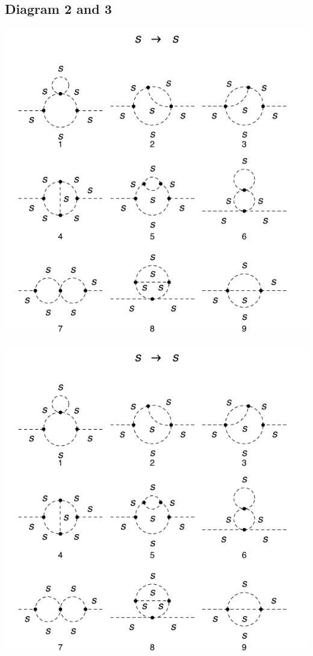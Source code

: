 \documentclass[11pt]{article}
\begin{document}
\subsection*{Diagram 2 and 3}
\begin{center}
\includegraphics{2loop_2.pdf}\ \ \ \ \ \ \includegraphics{2loop_3.pdf}\\
\end{center}
\end{document}
